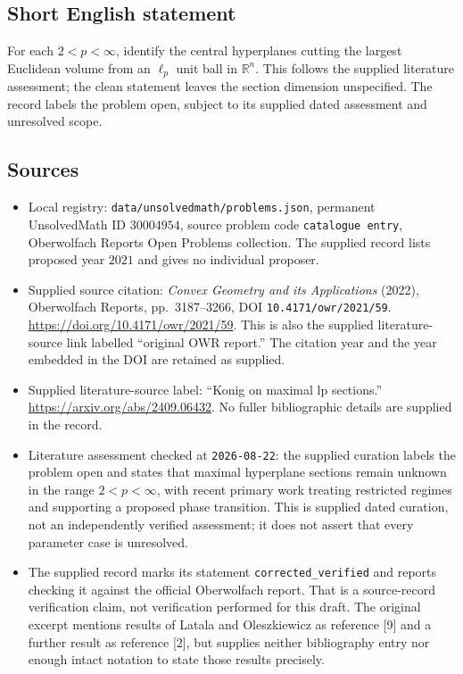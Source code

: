 \documentclass[11pt]{article}
\newcommand{\R}{\mathbb{R}}
\begin{document}
\subsection{Short English statement}
For each \(2<p<\infty\), identify the central hyperplanes cutting the largest Euclidean volume from an \(\ell_p\) unit ball in \(\R^n\). This follows the supplied literature assessment; the clean statement leaves the section dimension unspecified. The record labels the problem open, subject to its supplied dated assessment and unresolved scope.
\subsection{Sources}
\begin{itemize}
\item Local registry: \texttt{data/unsolvedmath/problems.json}, permanent UnsolvedMath ID \(30004954\), source problem code \texttt{catalogue entry}, Oberwolfach Reports Open Problems collection. The supplied record lists proposed year \(2021\) and gives no individual proposer.
\item Supplied source citation: \emph{Convex Geometry and its Applications} (2022), Oberwolfach Reports, pp.\ 3187--3266, DOI \texttt{10.4171/owr/2021/59}. \url{https://doi.org/10.4171/owr/2021/59}. This is also the supplied literature-source link labelled ``original OWR report.'' The citation year and the year embedded in the DOI are retained as supplied.
\item Supplied literature-source label: ``Konig on maximal lp sections.'' \url{https://arxiv.org/abs/2409.06432}. No fuller bibliographic details are supplied in the record.
\item Literature assessment checked at \texttt{2026-08-22}: the supplied curation labels the problem open and states that maximal hyperplane sections remain unknown in the range \(2<p<\infty\), with recent primary work treating restricted regimes and supporting a proposed phase transition. This is supplied dated curation, not an independently verified assessment; it does not assert that every parameter case is unresolved.
\item The supplied record marks its statement \texttt{corrected\_verified} and reports checking it against the official Oberwolfach report. That is a source-record verification claim, not verification performed for this draft. The original excerpt mentions results of Latala and Oleszkiewicz as reference [9] and a further result as reference [2], but supplies neither bibliography entry nor enough intact notation to state those results precisely.
\end{itemize}
\end{document}
